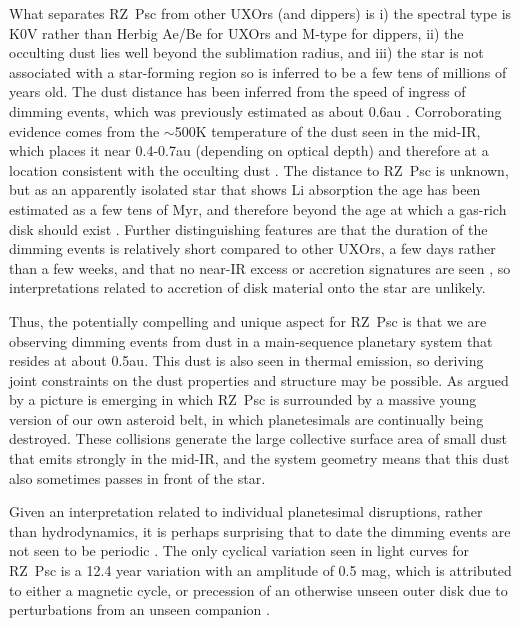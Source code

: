 \documentclass[useAMS,usenatbib,usegraphicx]{mn2e}
\begin{document}
What separates RZ~Psc from other UXOrs (and dippers) is i) the spectral type is K0V
rather than Herbig Ae/Be for UXOrs and M-type for dippers, ii) the occulting dust lies
well beyond the sublimation radius, and iii) the star is not associated with a
star-forming region so is inferred to be a few tens of millions of years old. The dust
distance has been inferred from the speed of ingress of dimming events, which was
previously estimated as about 0.6au \citep[for circular
orbits,][]{2013A&A...553L...1D}. Corroborating evidence comes from the $\sim$500K
temperature of the dust seen in the mid-IR, which places it near 0.4-0.7au (depending on
optical depth) and therefore at a location consistent with the occulting dust
\citep{2013A&A...553L...1D}. The distance to RZ~Psc is unknown, but as an apparently
isolated star that shows Li absorption the age has been estimated as a few tens of Myr,
and therefore beyond the age at which a gas-rich disk should exist
\citep{2010A&A...524A...8G,2014A&A...563A.139P}. Further distinguishing features are that
the duration of the dimming events is relatively short compared to other UXOrs, a few
days rather than a few weeks, and that no near-IR excess or accretion signatures are seen
\citep{2014A&A...563A.139P}, so interpretations related to accretion of disk material
onto the star \citep[e.g.][]{1999AJ....118.1043H,1999A&A...349..619B,2016arXiv160503985B}
are unlikely.

Thus, the potentially compelling and unique aspect for RZ~Psc is that we are observing
dimming events from dust in a main-sequence planetary system that resides at about
0.5au. This dust is also seen in thermal emission, so deriving joint constraints on the
dust properties and structure may be possible. As argued by \citet{2013A&A...553L...1D} a
picture is emerging in which RZ~Psc is surrounded by a massive young version of our own
asteroid belt, in which planetesimals are continually being destroyed. These collisions
generate the large collective surface area of small dust that emits strongly in the
mid-IR, and the system geometry means that this dust also sometimes passes in front of
the star.

Given an interpretation related to individual planetesimal disruptions, rather than
hydrodynamics, it is perhaps surprising that to date the dimming events are not seen to
be periodic \citep{1999AstL...25..243R,2013A&A...553L...1D}. The only cyclical variation
seen in light curves for RZ~Psc is a 12.4 year variation with an amplitude of 0.5 mag,
which is attributed to either a magnetic cycle, or precession of an otherwise unseen
outer disk due to perturbations from an unseen companion \citep{2013A&A...553L...1D}.
\end{document}
